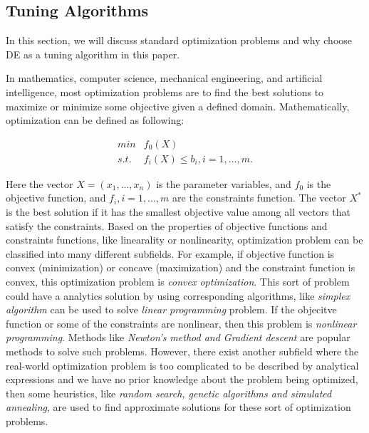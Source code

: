 


\subsection{Tuning Algorithms}
In this section, we will discuss standard optimization problems and why choose DE as
a tuning algorithm in this paper.

In mathematics, computer science, mechanical engineering, and artificial intelligence,  most optimization
problems are to find the best solutions to maximize or minimize some objective given a defined domain.
Mathematically, optimization can be defined as following:

\begin{equation}\label{eq1}
  \begin{array}{ll}
    min  & f_0(X) \\
    s.t. & f_i(X) \leq b_i, i=1,...,m.
  \end{array}
\end{equation}

Here the vector $X = (x_1,...,x_n)$ is the parameter variables, and $f_0$ is the objective function,
and $f_i, i=1,...,m$ are the constraints function. The vector $X^*$ is the best solution if it has the 
smallest objective value among all vectors that satisfy the constraints\cite{boyd2004convex}.
Based on the properties of objective functions and constraints functions, like linearality or nonlinearity,
optimization problem can be classified into many different subfields. For example, if objective function
is convex (minimization) or concave (maximization) and the constraint function is convex, 
this optimization problem is {\em convex optimization}. This sort of problem 
could have a analytics solution by using corresponding algorithms, like {\em simplex algorithm}
can be used to solve {\em linear programming} problem. If the objecitve function or some of 
the constraints are nonlinear, then this problem is {\em nonlinear programming}.
Methods like {\em Newton's method and Gradient descent} are popular methods to solve such problems.
However, there exist another subfield where the real-world optimization problem is too complicated to
be described by analytical expressions and we have no prior knowledge about the problem being optimized, then
some heuristics, like {\em random search, genetic algorithms and simulated annealing},
are used to find approximate solutions for these sort of optimization problems.
 



